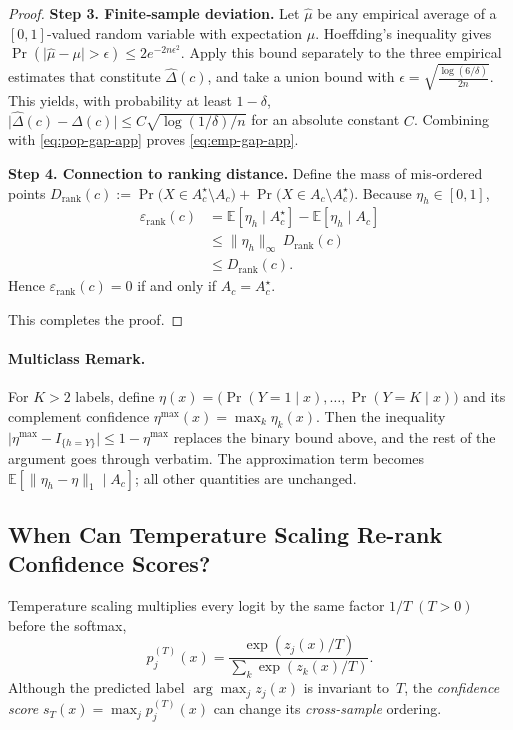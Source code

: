 \begin{proof}
\textbf{Step 3.  Finite‑sample deviation.}
Let \(\widehat{\mu}\) be any empirical average of a
\([0,1]\)-valued random variable with expectation \(\mu\).
Hoeffding’s inequality gives
\(\Pr(\lvert\widehat{\mu}-\mu\rvert>\epsilon)
   \le 2e^{-2n\epsilon^2}\).
Apply this bound separately to the three empirical estimates that
constitute \(\widehat{\Delta}(c)\), and take a union bound with
\(\epsilon=\sqrt{\tfrac{\log(6/\delta)}{2n}}\).
This yields, with probability at least \(1-\delta\),
\(
  \lvert\widehat{\Delta}(c)-\Delta(c)\rvert
  \le C\sqrt{\log(1/\delta)/n}
\)
for an absolute constant \(C\).
Combining with \eqref{eq:pop-gap-app} proves
\eqref{eq:emp-gap-app}.

\textbf{Step 4.  Connection to ranking distance.}
Define the mass of mis‑ordered points
\(D_{\mathrm{rank}}(c):=
 \Pr\bigl(X\in A_c^{\star}\setminus A_c\bigr)
 +\Pr\bigl(X\in A_c\setminus A_c^{\star}\bigr)\).
Because \(\eta_h\in[0,1]\),
\begin{align}
\varepsilon_{\mathrm{rank}}(c)
&=\mathbb E[\eta_h\mid A_c^{\star}]
  -\mathbb E[\eta_h\mid A_c]   \\[2pt]
&\le\bigl\|\eta_h\bigr\|_{\infty}\,
       D_{\mathrm{rank}}(c)        \\[2pt]
&\le D_{\mathrm{rank}}(c).
\end{align}
Hence \(\varepsilon_{\mathrm{rank}}(c)=0\)
if and only if \(A_c=A_c^{\star}\).

\smallskip\noindent
This completes the proof.
\end{proof}

\paragraph{Multiclass Remark.}
For \(K>2\) labels, define
\(\eta(x)=\bigl(\Pr(Y=1\mid x),\dots,\Pr(Y=K\mid x)\bigr)\)
and its complement confidence
\(\eta^{\max}(x)=\max_{k}\eta_k(x)\).
Then the inequality
\(\lvert\eta^{\max}-I_{\{h=Y\}}\rvert
 \le 1-\eta^{\max}\)
replaces the binary bound above, and the rest of the argument
goes through verbatim.  The approximation term becomes
\(\mathbb E[\lVert\eta_h-\eta\rVert_1\mid A_c]\);
all other quantities are unchanged.


\subsection{When Can Temperature Scaling Re-rank Confidence Scores?}
\label{app:ts-rerank}

Temperature scaling multiplies every logit by the same factor
$1/T\;(T>0)$ before the softmax,
\begin{equation}
p^{(T)}_j(x)= \frac{\exp(z_j(x)/T)}{\sum_k \exp(z_k(x)/T)}.
\end{equation}
Although the predicted label $\arg\max_j z_j(x)$ is invariant to~$T$,
the \emph{confidence score}
$s_T(x)=\max_j p^{(T)}_j(x)$
can change its \emph{cross-sample} ordering.

